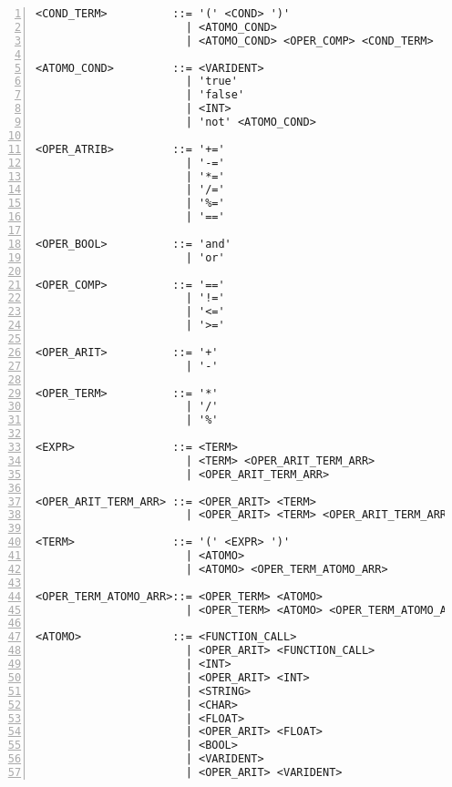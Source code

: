 \begin{lstlisting}[frame=single,numbers=left,breaklines=true,mathescape=true>,basicstyle=\ttfamily\scriptsize]
<COND_TERM>          ::= '(' <COND> ')' 
                       | <ATOMO_COND> 
                       | <ATOMO_COND> <OPER_COMP> <COND_TERM>

<ATOMO_COND>         ::= <VARIDENT> 
                       | 'true'
                       | 'false'
                       | <INT> 
                       | 'not' <ATOMO_COND>

<OPER_ATRIB>         ::= '+=' 
                       | '-=' 
                       | '*=' 
                       | '/=' 
                       | '%=' 
                       | '=='

<OPER_BOOL>          ::= 'and' 
                       | 'or'

<OPER_COMP>          ::= '==' 
                       | '!=' 
                       | '<=' 
                       | '>='

<OPER_ARIT>          ::= '+' 
                       | '-'

<OPER_TERM>          ::= '*' 
                       | '/' 
                       | '%'

<EXPR>               ::= <TERM> 
                       | <TERM> <OPER_ARIT_TERM_ARR>
                       | <OPER_ARIT_TERM_ARR>

<OPER_ARIT_TERM_ARR> ::= <OPER_ARIT> <TERM>
                       | <OPER_ARIT> <TERM> <OPER_ARIT_TERM_ARR>

<TERM>               ::= '(' <EXPR> ')'
                       | <ATOMO>
                       | <ATOMO> <OPER_TERM_ATOMO_ARR>

<OPER_TERM_ATOMO_ARR>::= <OPER_TERM> <ATOMO>
                       | <OPER_TERM> <ATOMO> <OPER_TERM_ATOMO_ARR>

<ATOMO>              ::= <FUNCTION_CALL>
                       | <OPER_ARIT> <FUNCTION_CALL>
                       | <INT>
                       | <OPER_ARIT> <INT>
                       | <STRING>
                       | <CHAR>
                       | <FLOAT>
                       | <OPER_ARIT> <FLOAT>
                       | <BOOL>
                       | <VARIDENT>
                       | <OPER_ARIT> <VARIDENT>
\end{lstlisting}
